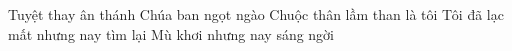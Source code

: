 Tuyệt thay ân thánh
Chúa ban ngọt ngào
Chuộc thân lầm than là tôi
Tôi đã lạc mất nhưng nay tìm lại
Mù khơi nhưng nay sáng ngời 
